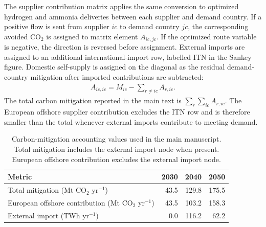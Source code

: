 \documentclass[sn-mathphys,Numbered]{sn-jnl}%
\theoremstyle{thmstyleone}%
\theoremstyle{thmstyletwo}%
\theoremstyle{thmstylethree}%
\begin{document}
The supplier contribution matrix applies the same conversion to optimized hydrogen and ammonia deliveries between each supplier and demand country. If a positive flow is sent from supplier $ic$ to demand country $jc$, the corresponding avoided CO$_2$ is assigned to matrix element $A_{ic,jc}$. If the optimized route variable is negative, the direction is reversed before assignment. External imports are assigned to an additional international-import row, labelled ITN in the Sankey figure. Domestic self-supply is assigned on the diagonal as the residual demand-country mitigation after imported contributions are subtracted:
\begin{align}
    A_{ic,ic} = M_{ic} - \sum_{r \neq ic} A_{r,ic}.
\end{align}
The total carbon mitigation reported in the main text is $\sum_r \sum_{ic} A_{r,ic}$. The European offshore supplier contribution excludes the ITN row and is therefore smaller than the total whenever external imports contribute to meeting demand.

\begin{table}[h]
\centering
\caption{Carbon-mitigation accounting values used in the main manuscript. Total mitigation includes the external import node when present. European offshore contribution excludes the external import node.}
\label{tab carbon accounting summary}
\begin{tabular}{lrrr}
\hline
Metric & 2030 & 2040 & 2050 \\ \hline
Total mitigation (Mt CO$_2$ yr$^{-1}$) & 43.5 & 129.8 & 175.5 \\
European offshore contribution (Mt CO$_2$ yr$^{-1}$) & 43.5 & 103.2 & 158.3 \\
External import (TWh yr$^{-1}$) & 0.0 & 116.2 & 62.2 \\ \hline
\end{tabular}
\end{table}


\end{document}
